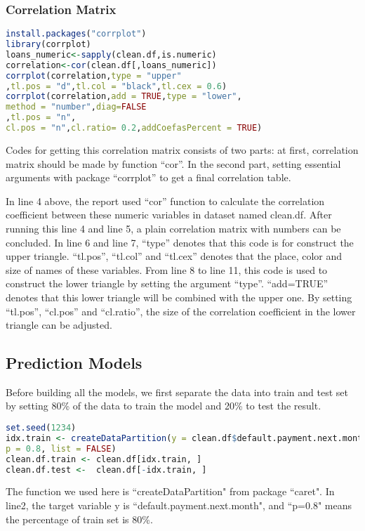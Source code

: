 \documentclass[a4paper,11pt]{article}
\begin{document}
\subsubsection{Correlation Matrix}
\begin{lstlisting}[language=R]
install.packages("corrplot")
library(corrplot)
loans_numeric<-sapply(clean.df,is.numeric)
correlation<-cor(clean.df[,loans_numeric])
corrplot(correlation,type = "upper"
,tl.pos = "d",tl.col = "black",tl.cex = 0.6)
corrplot(correlation,add = TRUE,type = "lower",
method = "number",diag=FALSE
,tl.pos = "n",
cl.pos = "n",cl.ratio= 0.2,addCoefasPercent = TRUE)
\end{lstlisting}
Codes for getting this correlation matrix consists of two parts: at first, correlation matrix should be made by function ``cor''. In the second part, setting essential arguments with package ``corrplot'' to get a final correlation table.

In line 4 above, the report used ``cor'' function to calculate the correlation coefficient between these numeric variables in dataset named clean.df. After running this line 4 and line 5, a plain correlation matrix with numbers can be concluded. In line 6 and line 7, ``type'' denotes that this code is for construct the upper triangle. ``tl.pos'', ``tl.col'' and ``tl.cex'' denotes that the place, color and size of names of these variables. From line 8 to line 11, this code is used to construct the lower triangle by setting the argument ``type''. ``add=TRUE'' denotes that this lower triangle will be combined with the upper one. By setting ``tl.pos'', ``cl.pos'' and ``cl.ratio'', the size of the correlation coefficient in the lower triangle can be adjusted.

\subsection{Prediction Models}
Before building all the models, we first separate the data into train and test set by setting 80\% of the data to train the model and 20\% to test the result.
\begin{lstlisting}[language=R]
set.seed(1234)
idx.train <- createDataPartition(y = clean.df$default.payment.next.month, 
p = 0.8, list = FALSE) 
clean.df.train <- clean.df[idx.train, ] 
clean.df.test <-  clean.df[-idx.train, ] 
\end{lstlisting}
The function we used here is ``createDataPartition" from package ``caret". In line2, the target variable y is ``default.payment.next.month", and ``p=0.8" means the percentage of train set is 80\%.
\end{document}
